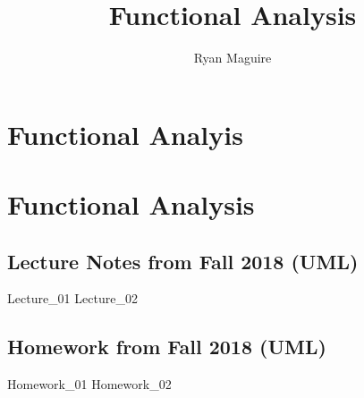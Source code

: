 \documentclass[crop=false,class=book,oneside]{standalone}
\begin{document}
    \ifx\ifmath\undefined
        \newif\iffunct
        \title{Functional Analysis}
        \author{Ryan Maguire}
        \date{\vspace{-5ex}}
        \maketitle
        \tableofcontents
        \clearpage
        \chapter*{Functional Analyis}
        \setcounter{chapter}{1}
    \else
        \chapter{Functional Analysis}
    \fi
    \section{Lecture Notes from Fall 2018 (UML)}
        {Lecture_01}
        {Lecture_02}
    \newpage
    \section{Homework from Fall 2018 (UML)}
        {Homework_01}
        {Homework_02}
\end{document}
